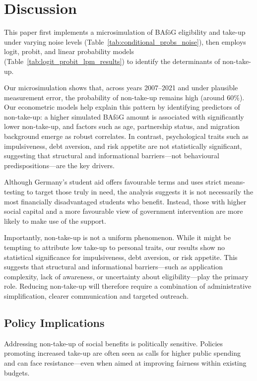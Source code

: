 \section{Discussion}
This paper first implements a microsimulation of BAföG eligibility and take-up under varying noise levels (Table~\ref{tab:conditional_probs_noise}), then employs logit, probit, and linear probability models (Table~\ref{tab:logit_probit_lpm_results}) to identify the determinants of non-take-up. 

Our microsimulation shows that, across years 2007–2021 and under plausible measurement error, the probability of non-take-up remains high (around 60\%). 
Our econometric models help explain this pattern by identifying predictors of non-take-up: a higher simulated BAföG amount is associated with significantly lower non-take-up, and factors such as age, partnership status, and migration background emerge as robust correlates. 
In contrast, psychological traits such as impulsiveness, debt aversion, and risk appetite are not statistically significant, suggesting that structural and informational barriers—not behavioural predispositions—are the key drivers.

Although Germany’s student aid offers favourable terms and uses strict means-testing to target those truly in need, the analysis suggests it is not necessarily the most financially disadvantaged students who benefit. 
Instead, those with higher social capital and a more favourable view of government intervention are more likely to make use of the support.

Importantly, non-take-up is not a uniform phenomenon. 
While it might be tempting to attribute low take-up to personal traits, our results show no statistical significance for impulsiveness, debt aversion, or risk appetite. 
This suggests that structural and informational barriers—such as application complexity, lack of awareness, or uncertainty about eligibility—play the primary role. 
Reducing non-take-up will therefore require a combination of administrative simplification, clearer communication and targeted outreach.

\subsection{Policy Implications}

Addressing non-take-up of social benefits is politically sensitive. Policies promoting increased take-up are often seen as calls for higher public spending and can face resistance—even when aimed at improving fairness within existing budgets.

